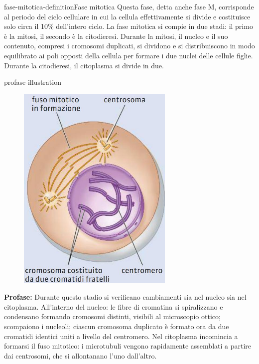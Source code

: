 \documentclass[preview]{standalone}
\begin{document}
\begin{snippetdefinition}{fase-mitotica-definition}{Fase mitotica}
    Questa fase, detta anche fase M, corrisponde al periodo del ciclo cellulare in cui la cellula
    effettivamente si divide e costituisce solo circa il 10\% dell'intero ciclo. La fase mitotica si
    compie in due stadi: il primo è la mitosi, il secondo è la citodieresi. Durante la mitosi, il
    nucleo e il suo contenuto, compresi i cromosomi duplicati, si dividono e si distribuiscono in
    modo equilibrato ai poli opposti della cellula per formare i due nuclei delle cellule figlie.
    Durante la citodieresi, il citoplasma si divide in due.
\end{snippetdefinition}

\begin{snippet}{profase-illustration}
    \setlength{\intextsep}{0pt}%
    \begin{figure}
        \includegraphics[width=7.5cm]{./resources/profase.jpg}
        \vspace{-1cm}
    \end{figure}

    \textbf{Profase:}
    Durante questo stadio si verificano cambiamenti sia nel nucleo sia nel citoplasma. All'interno
    del nucleo: le fibre di cromatina si spiralizzano e condensano formando cromosomi distinti,
    visibili al microscopio ottico; scompaiono i nucleoli; ciascun cromosoma duplicato è formato
    ora da due cromatidi identici uniti a livello del centromero. Nel citoplasma incomincia a
    formarsi il fuso mitotico: i microtubuli vengono rapidamente assemblati a partire dai
    centrosomi, che si allontanano l'uno dall'altro.
    \wrapfill
\end{snippet}
\end{document}

